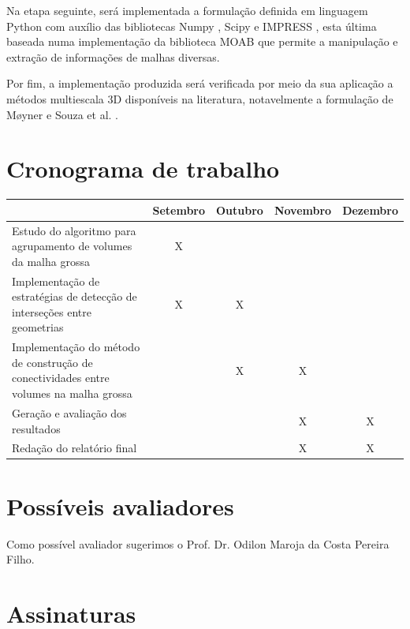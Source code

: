 \documentclass[a4paper, 10pt]{article}
\begin{document}
Na etapa seguinte, será implementada a formulação definida em linguagem Python com auxílio das bibliotecas Numpy \cite{Numpy}, Scipy \cite{Scipy} e IMPRESS \cite{Impress}, esta última baseada numa implementação da biblioteca MOAB \cite{MoabReport, MoabPaper} que permite a manipulação e extração de informações de malhas diversas.

Por fim, a implementação produzida será verificada por meio da sua aplicação a métodos multiescala 3D disponíveis na literatura, notavelmente a formulação de M\o yner \cite{Olav} e Souza et al. \cite{Souza}.

\clearpage
\section{Cronograma de trabalho}

\centering
{\def\arraystretch{2}\tabcolsep=10pt
\begin{tabular}{@{}P{5cm}||c|c|c|c}
     & Setembro & Outubro & Novembro & Dezembro \\
    \hline
    \hline
    Estudo do algoritmo para agrupamento de volumes da malha grossa & X & & &  \\
    \hline
    Implementação de estratégias de detecção de interseções entre geometrias & X & X & &  \\
    \hline
    Implementação do método de construção de conectividades entre volumes na malha grossa & & X & X &  \\
    \hline
    Geração e avaliação dos resultados & & & X & X \\
    \hline
    Redação do relatório final & & & X & X  \\
\end{tabular}}

\clearpage
\raggedright
\section{Possíveis avaliadores}

Como possível avaliador sugerimos o Prof. Dr. Odilon Maroja da Costa Pereira Filho.

\clearpage
\raggedright
\section{Assinaturas}
\end{document}
